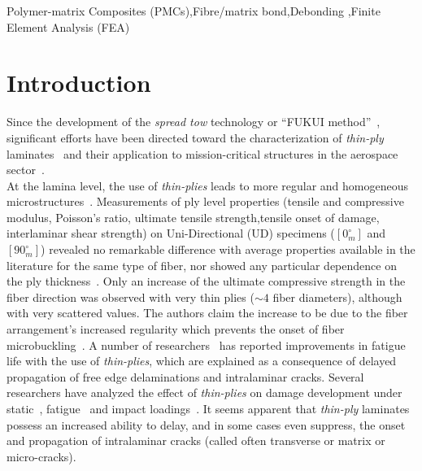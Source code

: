 \documentclass[review]{elsarticle}
\begin{document}
\begin{frontmatter}
\begin{keyword}
Polymer-matrix Composites (PMCs)\sep Fibre/matrix bond\sep Debonding \sep Finite Element Analysis (FEA)
\end{keyword}


\end{frontmatter}

\linenumbers


\section{Introduction}

Since the development of the \emph{spread tow} technology or ``FUKUI method''~\cite{Kawabe2008}, significant efforts have been directed toward the characterization of \emph{thin-ply} laminates~\cite{Yamaguchi2005,Sihn2007,Yokozeki2008,Yokozeki2010,Saito2012,Arteiro2013,Arteiro2014,Amacher2014,Guillamet2014,Cugnoni2018} and their application to mission-critical structures in the aerospace sector~\cite{Kopp2017}.\\%
At the lamina level, the use of \emph{thin-plies} leads to more regular and homogeneous microstructures~\cite{Saito2012,Amacher2014}. Measurements of ply level properties (tensile and compressive modulus, Poisson's ratio, ultimate tensile strength,tensile onset of damage, interlaminar shear strength) on Uni-Directional (UD) specimens ($\left[0_{m}^{\circ}\right]$ and $\left[90_{m}^{\circ}\right]$) revealed no remarkable difference with average properties available in the literature for the same type of fiber, nor showed any particular dependence on the ply thickness~\cite{Amacher2014}. Only an increase of the ultimate compressive strength in the fiber direction was observed with very thin plies ($\sim4$ fiber diameters), although with very scattered values. The authors claim the increase to be due to the fiber arrangement's increased regularity which prevents the onset of fiber microbuckling~\cite{Amacher2014}. A number of researchers~\cite{Yamaguchi2005,Sihn2007,Yokozeki2008} has reported improvements in fatigue life with the use of \emph{thin-plies}, which are explained as a consequence of delayed propagation of free edge delaminations and intralaminar cracks. Several researchers have analyzed the effect of \emph{thin-plies} on damage development under static~\cite{Sihn2007,Yokozeki2008,Yokozeki2010,Saito2012,Arteiro2013,Arteiro2014,Amacher2014}, fatigue~\cite{Yamaguchi2005,Sihn2007,Yokozeki2008,Yokozeki2010,Amacher2014} and impact loadings~\cite{Sihn2007,Yokozeki2008,Yokozeki2010,Amacher2014}. It seems apparent that \emph{thin-ply} laminates possess an increased ability to delay, and in some cases even suppress, the onset and propagation of intralaminar cracks (called often transverse or matrix or micro-cracks).\\
\end{document}
